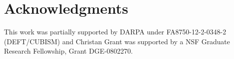 \documentclass{vldb}
\begin{document}






\balance

\section{Acknowledgments}
This work was partially supported by DARPA under FA8750-12-2-0348-2
(DEFT/CUBISM) and Christan Grant was supported by a NSF Graduate Research
Fellowship, Grant DGE-0802270.




\end{document}
